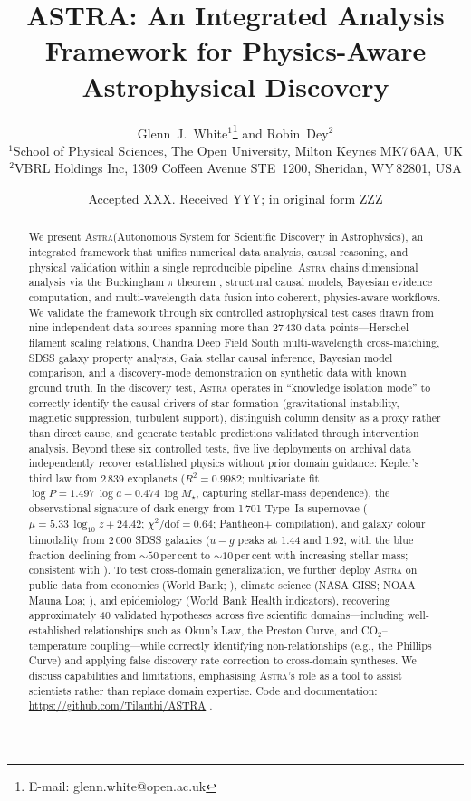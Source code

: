 \documentclass[fleqn,usenatbib]{mnras}
\title[ASTRA: An Integrated Analysis Framework]{ASTRA: An Integrated Analysis Framework for Physics-Aware Astrophysical Discovery}
\author[G.\,J.~White \& R.~Dey]{%
Glenn~J.~White$^{1}$\thanks{E-mail: glenn.white@open.ac.uk}
and Robin~Dey$^{2}$\\
$^{1}$School of Physical Sciences, The Open University, Milton Keynes MK7\,6AA, UK\\
$^{2}$VBRL Holdings Inc, 1309 Coffeen Avenue STE~1200, Sheridan, WY\,82801, USA}
\date{Accepted XXX. Received YYY; in original form ZZZ}
\newcommand{\astra}{\textsc{Astra}\xspace}
\begin{document}
\maketitle

\begin{abstract}
We present \astra (Autonomous System for Scientific Discovery in Astrophysics), an integrated framework that unifies numerical data analysis, causal reasoning, and physical validation within a single reproducible pipeline.
\astra chains dimensional analysis via the Buckingham $\pi$ theorem \citep{Buckingham1914}, structural causal models, Bayesian evidence computation, and multi-wavelength data fusion into coherent, physics-aware workflows.
We validate the framework through six controlled astrophysical test cases drawn from nine independent data sources spanning more than 27\,430 data points---Herschel filament scaling relations, Chandra Deep Field South multi-wavelength cross-matching, SDSS galaxy property analysis, Gaia stellar causal inference, Bayesian model comparison, and a discovery-mode demonstration on synthetic data with known ground truth.
In the discovery test, \astra operates in ``knowledge isolation mode'' to correctly identify the causal drivers of star formation (gravitational instability, magnetic suppression, turbulent support), distinguish column density as a proxy rather than direct cause, and generate testable predictions validated through intervention analysis.
Beyond these six controlled tests, five live deployments on archival data independently recover established physics without prior domain guidance: Kepler's third law from 2\,839 exoplanets ($R^{2}=0.9982$; multivariate fit $\log P = 1.497\,\log a - 0.474\,\log M_{\star}$, capturing stellar-mass dependence), the observational signature of dark energy from 1\,701 Type~Ia supernovae ($\mu = 5.33\,\log_{10}z + 24.42$; $\chi^{2}/\mathrm{dof} = 0.64$; \citealt{Brout2022} Pantheon+ compilation), and galaxy colour bimodality from 2\,000 SDSS galaxies ($u{-}g$ peaks at 1.44 and 1.92, with the blue fraction declining from ${\sim}50$\,per\,cent to ${\sim}10$\,per\,cent with increasing stellar mass; consistent with \citealt{Strateva2001}).
To test cross-domain generalization, we further deploy \astra on public data from economics (World Bank; \citealt{WorldBank2024}), climate science (NASA GISS; NOAA Mauna Loa; \citealt{Hansen2010,NOAA2024}), and epidemiology (World Bank Health indicators), recovering approximately 40 validated hypotheses across five scientific domains---including well-established relationships such as Okun's Law, the Preston Curve, and CO$_{2}$--temperature coupling---while correctly identifying non-relationships (e.g., the Phillips Curve) and applying false discovery rate correction \citep{BenjaminiHochberg1995} to cross-domain syntheses.
We discuss capabilities and limitations, emphasising \astra's role as a tool to assist scientists rather than replace domain expertise.
Code and documentation: \url{https://github.com/Tilanthi/ASTRA} \citep{WhiteDey2026}.
\end{abstract}
\end{document}
